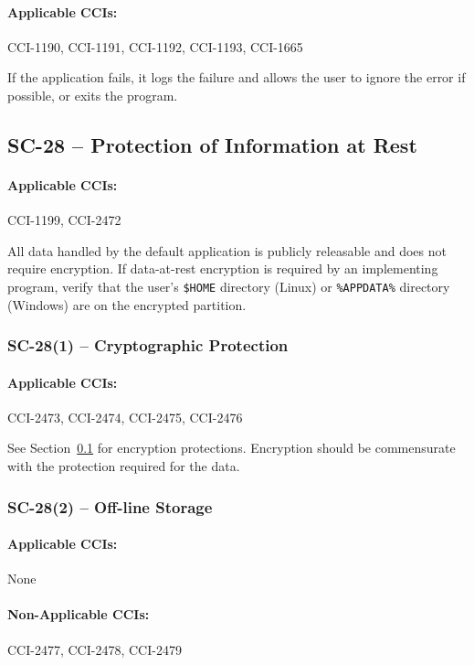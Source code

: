 \documentclass[letterpaper, 10pt, twoside]{article}
\begin{document}
\paragraph{Applicable CCIs:} CCI-1190, CCI-1191, CCI-1192, CCI-1193, CCI-1665

If the application fails, it logs the failure and allows the user to ignore the error if possible, or exits the program.

\subsection{SC-28 -- Protection of Information at Rest}
\label{sec:sc-28}

\paragraph{Applicable CCIs:} CCI-1199, CCI-2472

All data handled by the default application is publicly releasable and does not require encryption. If data-at-rest encryption is required by an implementing program, verify that the user's \texttt{\$HOME} directory (Linux) or \texttt{\%APPDATA\%} directory (Windows) are on the encrypted partition.

\subsubsection{SC-28(1) -- Cryptographic Protection}

\paragraph{Applicable CCIs:} CCI-2473, CCI-2474, CCI-2475, CCI-2476

See Section~\ref{sec:sc-28} for encryption protections. Encryption should be commensurate with the protection required for the data.

\subsubsection{SC-28(2) -- Off-line Storage}

\paragraph{Applicable CCIs:} None

\paragraph{Non-Applicable CCIs:} CCI-2477, CCI-2478, CCI-2479
\end{document}
